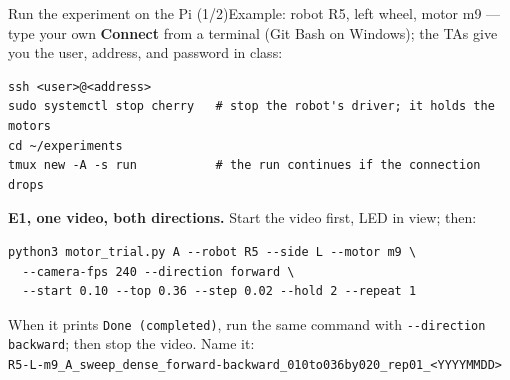 %
\begin{frame}[fragile]{Run the experiment on the Pi (1/2)}{Example: robot R5, left wheel, motor m9 --- type your own}
  \scriptsize
  \textbf{Connect} from a terminal (Git Bash on Windows); the TAs give you the user, address, and password in class:
\begin{verbatim}
ssh <user>@<address>
sudo systemctl stop cherry   # stop the robot's driver; it holds the motors
cd ~/experiments
tmux new -A -s run           # the run continues if the connection drops
\end{verbatim}
  \vspace{-4pt}
  \textbf{E1, one video, both directions.} Start the video first, LED in view; then:
\begin{verbatim}
python3 motor_trial.py A --robot R5 --side L --motor m9 \
  --camera-fps 240 --direction forward \
  --start 0.10 --top 0.36 --step 0.02 --hold 2 --repeat 1
\end{verbatim}
  \vspace{-4pt}
  When it prints \texttt{Done (completed)}, run the same command with \verb|--direction backward|; then stop the video. Name it:\\
  \texttt{R5-L-m9\_A\_sweep\_dense\_forward-backward\_010to036by020\_rep01\_<YYYYMMDD>}
\end{frame}
